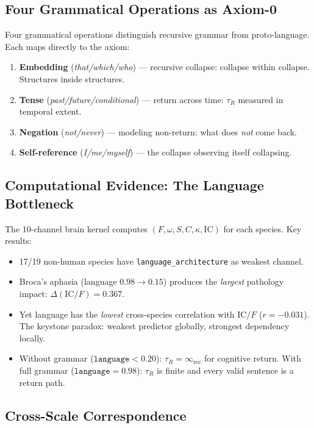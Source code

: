 \documentclass[
  aps,
  prd,
  twocolumn,
  superscriptaddress,
  nofootinbib,
  floatfix
]{revtex4-2}
\newcommand{\tR}{\tau_{\!R}}
\newcommand{\IR}{\infty_{\mathrm{rec}}}
\newcommand{\Fid}{F}
\newcommand{\Drft}{\omega}
\newcommand{\Ent}{S}
\newcommand{\Curv}{C}
\newcommand{\Logint}{\kappa}
\newcommand{\IC}{\mathrm{IC}}
\newcommand{\lat}[1]{\textit{#1}}
\begin{document}
\subsection{Four Grammatical Operations as Axiom-0}

Four grammatical operations distinguish recursive grammar from
proto-language. Each maps directly to the axiom:

\begin{enumerate}[nosep,leftmargin=*]
\item \textbf{Embedding} (\lat{that/which/who}) --- recursive
  collapse: collapse within collapse. Structures inside structures.
\item \textbf{Tense} (\lat{past/future/conditional}) --- return
  across time: $\tR$ measured in temporal extent.
\item \textbf{Negation} (\lat{not/never}) --- modeling non-return:
  what does \emph{not} come back.
\item \textbf{Self-reference} (\lat{I/me/myself}) --- the
  collapse observing itself collapsing.
\end{enumerate}

\subsection{Computational Evidence: The Language Bottleneck}

The 10-channel brain kernel computes
$(\Fid,\Drft,\Ent,\Curv,\Logint,\IC)$ for each species. Key
results:

\begin{itemize}[nosep,leftmargin=*]
\item 17/19 non-human species have \texttt{language\_architecture}
  as weakest channel.
\item Broca's aphasia (language $0.98 \to 0.15$) produces the
  \emph{largest} pathology impact: $\Delta(\IC/\Fid) = 0.367$.
\item Yet language has the \emph{lowest} cross-species correlation
  with $\IC/\Fid$ ($r = -0.031$). The keystone paradox: weakest
  predictor globally, strongest dependency locally.
\item Without grammar ($\texttt{language} < 0.20$):
  $\tR = \IR$ for cognitive return. With full grammar
  ($\texttt{language} = 0.98$): $\tR$ is finite and every
  valid sentence is a return path.
\end{itemize}

\subsection{Cross-Scale Correspondence}
\end{document}
